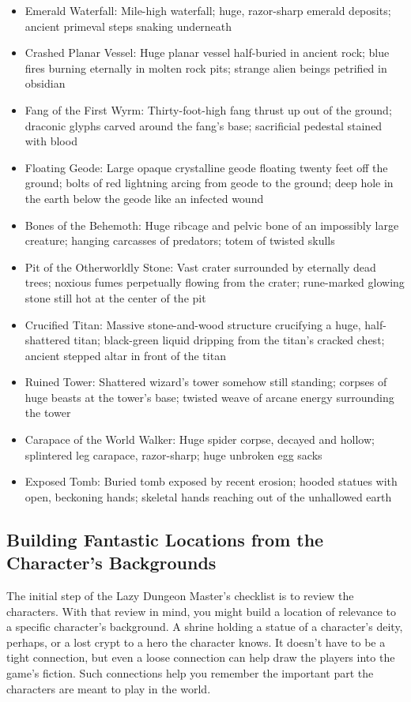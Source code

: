 \documentclass[10pt,a4paper,twoside,bg=print,twocolumn,openany,nodeprecatedcode]{dndbook}
\begin{document}
\begin{itemize}
\item Emerald Waterfall: Mile-high waterfall; huge, razor-sharp emerald deposits; ancient primeval steps snaking underneath
\item Crashed Planar Vessel: Huge planar vessel half-buried in ancient rock; blue fires burning eternally in molten rock pits; strange alien beings petrified in obsidian
\item Fang of the First Wyrm: Thirty-foot-high fang thrust up out of the ground; draconic glyphs carved around the fang's base; sacrificial pedestal stained with blood
\item Floating Geode: Large opaque crystalline geode floating twenty feet off the ground; bolts of red lightning arcing from geode to the ground; deep hole in the earth below the geode like an infected wound
\item Bones of the Behemoth: Huge ribcage and pelvic bone of an impossibly large creature; hanging carcasses of predators; totem of twisted skulls
\item Pit of the Otherworldly Stone: Vast crater surrounded by eternally dead trees; noxious fumes perpetually flowing from the crater; rune-marked glowing stone still hot at the center of the pit
\item Crucified Titan: Massive stone-and-wood structure crucifying a huge, half-shattered titan; black-green liquid dripping from the titan's cracked chest; ancient stepped altar in front of the titan
\item Ruined Tower: Shattered wizard's tower somehow still standing; corpses of huge beasts at the tower's base; twisted weave of arcane energy surrounding the tower
\item Carapace of the World Walker: Huge spider corpse, decayed and hollow; splintered leg carapace, razor-sharp; huge unbroken egg sacks
\item Exposed Tomb: Buried tomb exposed by recent erosion; hooded statues with open, beckoning hands; skeletal hands reaching out of the unhallowed earth
\end{itemize}

\subsection{Building Fantastic Locations from the Character's Backgrounds}
The initial step of the Lazy Dungeon Master's checklist is to review the characters. With that review in mind, you might build a location of relevance to a specific character's background. A shrine holding a statue of a character's deity, perhaps, or a lost crypt to a hero the character knows. It doesn't have to be a tight connection, but even a loose connection can help draw the players into the game's fiction. Such connections help you remember the important part the characters are meant to play in the world.
\end{document}
